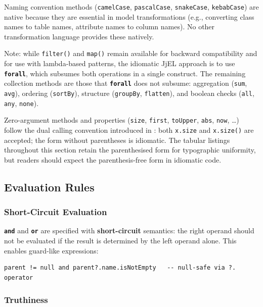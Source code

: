 \documentclass[11pt,a4paper]{article}
\newcommand{\jjel}{\textsf{JjEL}}
\newcommand{\kw}[1]{\texttt{\textbf{#1}}}
\begin{document}
Naming convention methods (\texttt{camelCase}, \texttt{pascalCase}, \texttt{snakeCase}, \texttt{kebabCase}) are native because they are essential in model transformations (e.g., converting class names to table names, attribute names to column names). No other transformation language provides these natively.

Note: while \texttt{filter()} and \texttt{map()} remain available for backward compatibility and for use with lambda-based patterns, the idiomatic \jjel{} approach is to use \kw{forall}, which subsumes both operations in a single construct. The remaining collection methods are those that \kw{forall} does not subsume: aggregation (\texttt{sum}, \texttt{avg}), ordering (\texttt{sortBy}), structure (\texttt{groupBy}, \texttt{flatten}), and boolean checks (\texttt{all}, \texttt{any}, \texttt{none}).

Zero-argument methods and properties (\texttt{size}, \texttt{first}, \texttt{toUpper}, \texttt{abs}, \texttt{now}, \dots) follow the dual calling convention introduced in : both \texttt{x.size} and \texttt{x.size()} are accepted; the form without parentheses is idiomatic. The tabular listings throughout this section retain the parenthesised form for typographic uniformity, but readers should expect the parenthesis-free form in idiomatic code.


\subsection{Evaluation Rules}

\subsubsection{Short-Circuit Evaluation}

\kw{and} and \kw{or} are specified with \textbf{short-circuit} semantics: the right operand should not be evaluated if the result is determined by the left operand alone. This enables guard-like expressions:

\begin{lstlisting}[style=jjel,numbers=none]
parent != null and parent?.name.isNotEmpty   -- null-safe via ?. operator
\end{lstlisting}

\subsubsection{Truthiness}
\end{document}
